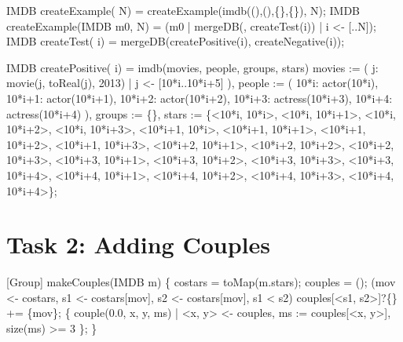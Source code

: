 \documentclass[submission,copyright,creativecommons]{eptcs}
\begin{document}
\begin{rascal}
IMDB createExample( N) = createExample(imdb((),(),\{{}\}{},\{{}\}{}), N);
IMDB createExample(IMDB m0,  N) = (m0 | mergeDB(, createTest(i)) | i \textless{}- {}[..N]);
IMDB createTest( i) = mergeDB(createPositive(i), createNegative(i));
    
IMDB createPositive( i) = imdb(movies, people, groups, stars)
     movies := ( j: movie(j, toReal(j), 2013) | j \textless{}- {}[10*i..10*i+5] ),
         people := ( 10*i: actor(10*i), 10*i+1: actor(10*i+1), 
                     10*i+2: actor(10*i+2), 10*i+3: actress(10*i+3), 
                     10*i+4: actress(10*i+4) ),
         groups := \{{}\}{},
         stars := \{{}\textless{}10*i, 10*i\textgreater{}, \textless{}10*i, 10*i+1\textgreater{}, \textless{}10*i, 10*i+2\textgreater{}, \textless{}10*i, 10*i+3\textgreater{},
                 \textless{}10*i+1, 10*i\textgreater{}, \textless{}10*i+1, 10*i+1\textgreater{}, \textless{}10*i+1, 10*i+2\textgreater{}, \textless{}10*i+1, 10*i+3\textgreater{},
                 \textless{}10*i+2, 10*i+1\textgreater{}, \textless{}10*i+2, 10*i+2\textgreater{}, \textless{}10*i+2, 10*i+3\textgreater{},
                 \textless{}10*i+3, 10*i+1\textgreater{}, \textless{}10*i+3, 10*i+2\textgreater{}, \textless{}10*i+3, 10*i+3\textgreater{}, \textless{}10*i+3, 10*i+4\textgreater{},
                 \textless{}10*i+4, 10*i+1\textgreater{}, \textless{}10*i+4, 10*i+2\textgreater{}, \textless{}10*i+4, 10*i+3\textgreater{}, \textless{}10*i+4, 10*i+4\textgreater{}\}{};          
\end{rascal}


\section{Task 2: Adding Couples}

\begin{rascal}
[Group] makeCouples(IMDB m) \{{}
    costars = toMap(m.stars); couples = ();
     (mov \textless{}- costars, s1 \textless{}- costars{}[mov], s2 \textless{}- costars{}[mov], s1 \textless{} s2) 
       couples{}[\textless{}s1, s2\textgreater{}]?\{\} += \{{}mov\}{};
     \{{} couple(0.0, x, y, ms) 
                     | \textless{}x, y\textgreater{} \textless{}- couples, ms := couples{}[\textless{}x, y\textgreater{}], size(ms) \textgreater{}= 3 \}{};
\}{}
\end{rascal}
\end{document}
